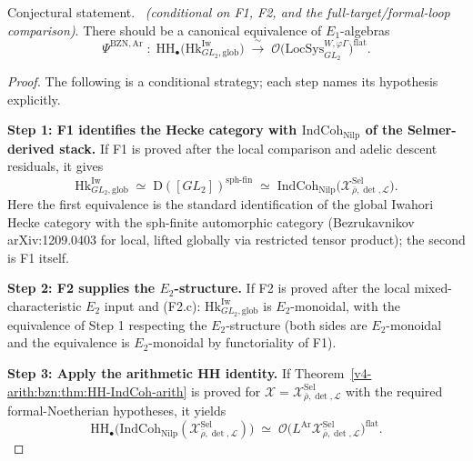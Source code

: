 \begin{theorem}
\label{v4-arith:bzn:thm:main-body}
Conjectural statement. \ \emph{(conditional on F1, F2, and the
full-target/formal-loop comparison)}.
There should be a canonical equivalence of \(E_{1}\)-algebras
\begin{equation}
\Psi^{\mathrm{BZN,Ar}}\;\colon\;\mathrm{HH}_{\bullet}\bigl(\mathrm{Hk}^{\mathrm{Iw}}_{GL_{2},\mathrm{glob}}\bigr)\;\xrightarrow{\;\sim\;}\;\mathcal{O}\bigl(\mathrm{LocSys}^{W,\varphi\Gamma}_{GL_{2}}\bigr)^{\mathrm{flat}}.
\end{equation}
\end{theorem}

\begin{proof}
The following is a conditional strategy; each step names its
hypothesis explicitly.

\medskip\noindent\textbf{Step 1: F1 identifies the Hecke category with
\(\mathrm{IndCoh}_{\mathrm{Nilp}}\) of the Selmer-derived stack.}
If F1 is proved after the local comparison and adelic descent
residuals, it gives
\begin{equation}
\mathrm{Hk}^{\mathrm{Iw}}_{GL_{2},\mathrm{glob}}\;\simeq\;\mathrm{D}([GL_{2}])^{\mathrm{sph\text{-}fin}}\;\simeq\;\mathrm{IndCoh}_{\mathrm{Nilp}}\bigl(\mathcal{X}^{\mathrm{Sel}}_{\bar\rho,\det,\mathcal{L}}\bigr).
\end{equation}
Here the first equivalence is the standard identification of the
global Iwahori Hecke category with the sph-finite automorphic
category (Bezrukavnikov arXiv:1209.0403 for local, lifted
globally via restricted tensor product); the second is F1
itself.

\medskip\noindent\textbf{Step 2: F2 supplies the \(E_{2}\)-structure.}
If F2 is proved after the local mixed-characteristic \(E_{2}\) input and
(F2.c):
\(\mathrm{Hk}^{\mathrm{Iw}}_{GL_{2},\mathrm{glob}}\) is
\(E_{2}\)-monoidal, with the equivalence of Step 1 respecting the
\(E_{2}\)-structure (both sides are \(E_{2}\)-monoidal and the
equivalence is \(E_{2}\)-monoidal by functoriality of F1).

\medskip\noindent\textbf{Step 3: Apply the arithmetic HH identity.}
If Theorem~\ref{v4-arith:bzn:thm:HH-IndCoh-arith} is proved for
\(\mathcal{X}=\mathcal{X}^{\mathrm{Sel}}_{\bar\rho,\det,\mathcal{L}}\)
with the required formal-Noetherian hypotheses, it yields
\begin{equation}
\mathrm{HH}_{\bullet}\bigl(\mathrm{IndCoh}_{\mathrm{Nilp}}(\mathcal{X}^{\mathrm{Sel}}_{\bar\rho,\det,\mathcal{L}})\bigr)\;\simeq\;\mathcal{O}\bigl(L^{\mathrm{Ar}}\mathcal{X}^{\mathrm{Sel}}_{\bar\rho,\det,\mathcal{L}}\bigr)^{\mathrm{flat}}.
\end{equation}


\end{proof}
